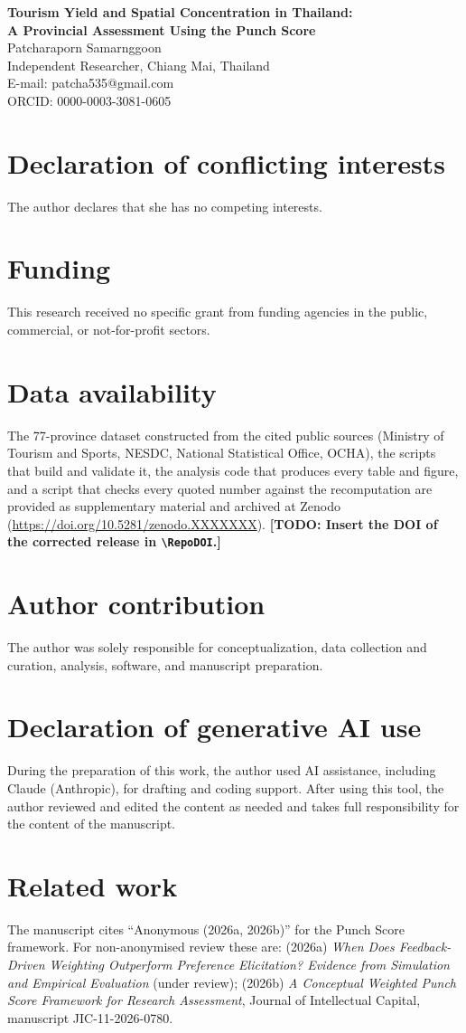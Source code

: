 \documentclass[11pt,a4paper]{article}
\newif\ifdraft \drafttrue
\newcommand{\todo}[1]{\ifdraft{\color{red}\textbf{[TODO: #1]}}\fi}
\newcommand{\RepoDOI}{10.5281/zenodo.XXXXXXX}   %
\begin{document}
\begin{center}
{\LARGE\bfseries Tourism Yield and Spatial Concentration in Thailand:\\ A Provincial Assessment Using the Punch Score}\\[1.5em]
{\large Patcharaporn Samarnggoon}\\
Independent Researcher, Chiang Mai, Thailand\\
E-mail: patcha535@gmail.com\\
ORCID: 0000-0003-3081-0605
\end{center}
\bigskip
\section*{Declaration of conflicting interests}
The author declares that she has no competing interests.
\section*{Funding}
This research received no specific grant from funding agencies in the public, commercial, or not-for-profit sectors.
\section*{Data availability}
The 77-province dataset constructed from the cited public sources (Ministry of Tourism and Sports, NESDC, National Statistical Office, OCHA), the scripts that build and validate it, the analysis code that produces every table and figure, and a script that checks every quoted number against the recomputation are provided as supplementary material and archived at Zenodo (\url{https://doi.org/\RepoDOI}). \todo{Insert the DOI of the corrected release in \texttt{\textbackslash RepoDOI}.}
\section*{Author contribution}
The author was solely responsible for conceptualization, data collection and curation, analysis, software, and manuscript preparation.
\section*{Declaration of generative AI use}
During the preparation of this work, the author used AI assistance, including Claude (Anthropic), for drafting and coding support. After using this tool, the author reviewed and edited the content as needed and takes full responsibility for the content of the manuscript.
\section*{Related work}
The manuscript cites ``Anonymous (2026a, 2026b)'' for the Punch Score framework. For non-anonymised review these are: (2026a) \emph{When Does Feedback-Driven Weighting Outperform Preference Elicitation? Evidence from Simulation and Empirical Evaluation} (under review); (2026b) \emph{A Conceptual Weighted Punch Score Framework for Research Assessment}, Journal of Intellectual Capital, manuscript JIC-11-2026-0780.
\end{document}
